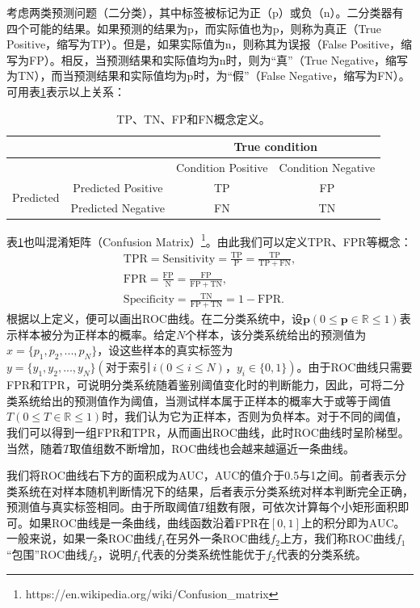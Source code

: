 考虑两类预测问题（二分类），其中标签被标记为正（p）或负（n）。二分类器有四个可能的结果。如果预测的结果为p，而实际值也为p，则称为真正（True Positive，缩写为TP）。但是，如果实际值为n，则称其为误报（False Positive，缩写为FP）。相反，当预测结果和实际值均为n时，则为“真”（True Negative，缩写为TN），而当预测结果和实际值均为p时，为“假”（False Negative，缩写为FN）。可用表\ref{tab:confusion_mateix}表示以上关系：
\begin{table}[h]
	\centering
	\caption{TP、TN、FP和FN概念定义。}
	\label{tab:confusion_mateix}
	\begin{tabular}{c|c|c|c}
		\toprule[2pt]
		&                   & \multicolumn{2}{c}{True condition}     \\ 
				\midrule[2pt]
		&  & Condition Positive & Condition Negative \\ \hline
		\multirow{2}{*}{Predicted} & Predicted Positive & TP  & FP \\ \cline{2-4} 
		& Predicted Negative & FN & TN  \\ 
		\bottomrule[2pt]
	\end{tabular}
\end{table}

\noindent 表\ref{tab:confusion_mateix}也叫混淆矩阵（Confusion Matrix）\footnote{https://en.wikipedia.org/wiki/Confusion\_matrix}。由此我们可以定义TPR、FPR等概念：
\begin{gather}
	\mathrm{TPR}=\mathrm{Sensitivity}=\frac{\mathrm{TP}}{\mathrm{P}}=\frac{\mathrm{TP}}{\mathrm{TP}+\mathrm{FN}},\\
	\mathrm{FPR}=\frac{\mathrm{FP}}{\mathrm{N}}=\frac{\mathrm{FP}}{\mathrm{FP}+\mathrm{TN}},\\
	\mathrm{Specificity}=\frac{\mathrm{TN}}{\mathrm{FP}+\mathrm{TN}}=1-\mathrm{FPR}.
\end{gather}
根据以上定义，便可以画出ROC曲线。在二分类系统中，设$\boldsymbol{p}(0\leq \boldsymbol{p}\in \mathbb{R} \leq 1)$表示样本被分为正样本的概率。给定$N$个样本，该分类系统给出的预测值为$x=\{p_1,p_2,...,p_N
\}$，设这些样本的真实标签为$y=\{y_1,y_2,...,y_N\}(\text{对于索引}\, i(0\leq i \le N)\text{，}y_i\in \{0,1\})$。由于ROC曲线只需要FPR和TPR，可说明分类系统随着鉴别阈值变化时的判断能力，因此，可将二分类系统给出的预测值作为阈值，当测试样本属于正样本的概率大于或等于阈值$T(0\leq T\in \mathbb{R} \leq 1)$时，我们认为它为正样本，否则为负样本。对于不同的阈值，我们可以得到一组FPR和TPR，从而画出ROC曲线，此时ROC曲线时呈阶梯型。当然，随着$T$取值组数不断增加，ROC曲线也会越来越逼近一条曲线。

我们将ROC曲线右下方的面积成为AUC，AUC的值介于0.5与1之间。前者表示分类系统在对样本随机判断情况下的结果，后者表示分类系统对样本判断完全正确，预测值与真实标签相同。由于所取阈值$T$组数有限，可依次计算每个小矩形面积即可。如果ROC曲线是一条曲线，曲线函数沿着FPR在$[0,1]$上的积分即为AUC。一般来说，如果一条ROC曲线$f_1$在另外一条ROC曲线$f_2$上方，我们称ROC曲线$f_1$“包围”ROC曲线$f_2$，说明$f_1$代表的分类系统性能优于$f_2$代表的分类系统。
